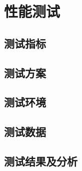 
\chapter{性能测试}
\label{chap:benchmark}

\section{测试指标}
\label{sec:benchmark-index}

\section{测试方案}
\label{sec:benchmark-scheme}

\section{测试环境}
\label{sec:benchmark-env}

\section{测试数据}
\label{sec:benchmark-data}

\section{测试结果及分析}
\label{sec:result-and-analysis}

